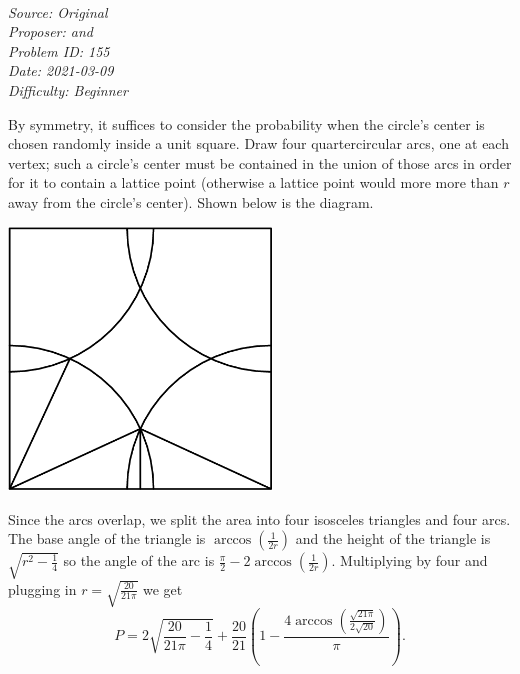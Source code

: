 \SSbreak\\
\emph{Source: Original}\\
\emph{Proposer: \Ptan and \Pwen}\\
\emph{Problem ID: 155}\\
\emph{Date: 2021-03-09}\\
\emph{Difficulty: Beginner}\\
\SSbreak

\bigskip

\begin{solution}\hfil\medskip
  
    By symmetry, it suffices to consider the probability when the circle's center is chosen randomly inside a unit square. Draw four quartercircular arcs,
    one at each vertex; such a circle's center must be contained in the union of those arcs in order for it to contain a lattice point (otherwise a lattice point
    would more more than $r$ away from the circle's center). Shown below is the diagram.

    \begin{center}
        \includegraphics[width=7cm,height=7cm]{Sections/Files/11-2-1-img.png}
    \end{center}

    Since the arcs overlap, we split the area into four isosceles triangles and four arcs. The base angle of the triangle is $\arccos\left(\frac{1}{2r}\right)$
    and the height of the triangle is $\sqrt{r^2 - \frac{1}{4}}$ so the angle of the arc is $\frac{\pi}{2} - 2 \arccos\left(\frac{1}{2r}\right).$ Multiplying by
    four and plugging in $r = \sqrt{\frac{20}{21\pi}}$ we get
    $$P = \boxed{2 \sqrt{\dfrac{20}{21\pi} - \dfrac{1}{4}} + \dfrac{20}{21}\left(1 - \dfrac{4 \arccos\left(\frac{\sqrt{21 \pi}}{2\sqrt{20}}\right)}{\pi}\right)}.$$
\end{solution}\bigskip
